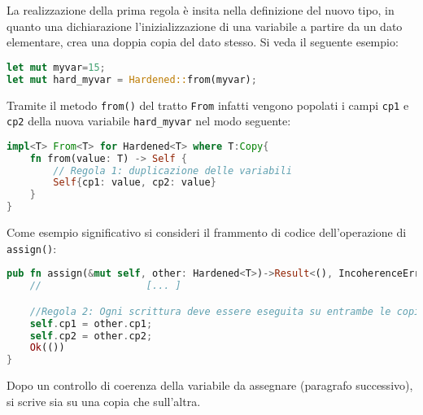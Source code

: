 \noindent
La realizzazione della prima regola è insita nella definizione del nuovo tipo, in quanto una dichiarazione l'inizializzazione di una variabile a partire da un dato elementare, crea una doppia copia del dato stesso. Si veda il seguente esempio: 
\begin{lstlisting}[language=rust, style=boxed]
let mut myvar=15; 
let mut hard_myvar = Hardened::from(myvar);
\end{lstlisting}
Tramite il metodo \texttt{from()} del tratto \texttt{From} infatti vengono popolati i campi \texttt{cp1} e \texttt{cp2} della nuova variabile \texttt{hard\_myvar} nel modo seguente: 

\begin{lstlisting}[language=rust, style=boxed]
impl<T> From<T> for Hardened<T> where T:Copy{
    fn from(value: T) -> Self {
        // Regola 1: duplicazione delle variabili
        Self{cp1: value, cp2: value}
    }
}   
\end{lstlisting}

\noindent
\begin{center}
\end{center}
Come esempio significativo si consideri il frammento di codice dell'operazione di \texttt{assign()}:

\begin{lstlisting}[language=rust, style=boxed]
pub fn assign(&mut self, other: Hardened<T>)->Result<(), IncoherenceError>{
    //                  [... ]

    //Regola 2: Ogni scrittura deve essere eseguita su entrambe le copie
    self.cp1 = other.cp1;
    self.cp2 = other.cp2;
    Ok(())
}
\end{lstlisting}
Dopo un controllo di coerenza della variabile da assegnare (paragrafo successivo), si scrive sia su una copia che sull'altra.

